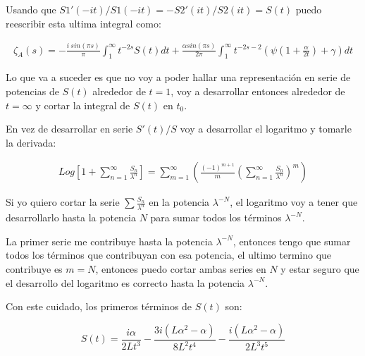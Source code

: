 Usando que $S1' (-it)/S1 (-i t) = - S2 ' (i t) / S2(it)  = S(t) $ puedo reescribir esta ultima integral como:

\begin{equation}
\begin{array}{c}
\zeta _A (s) =  
-  \frac{i \ sin (\pi s)}{\pi} \int _1 ^{\infty} t ^{-2s} S(t) dt + 
\frac{\alpha sin( \pi s )}{2 \pi } \int _{1} ^{\infty} 
t ^{-2s-2} \left( \psi (1 + \frac{\alpha}{2 t}) + \gamma \right) dt
\end{array}
\end{equation}

Lo que va a suceder es que no voy a poder hallar una representación en serie de potencias de $S(t)$ alrededor de $t=1$, voy a desarrollar entonces alrededor de $t = \infty$ y cortar la integral de $S(t) $ en $t _0$.




En vez de desarrollar en serie $S'(t) /S$ voy a desarrollar el logaritmo y tomarle la derivada:

\begin{equation}
\begin{array}{c}

Log 
\left[
	1 + \sum _{n=1} ^{\infty}  \frac{S _n}{\lambda ^n}
	\right] =
	
\sum _{m = 1} ^{\infty} 
	\left(
	\frac{(-1) ^{m+1} }{m}
	\left(
		\sum _{n=1} ^{\infty} \frac{S _n}{\lambda ^n}
		\right) ^m 
	\right)
\end{array}	
\end{equation}

Si yo quiero cortar la serie $\sum \frac{S _n}{\lambda ^n}$ en la potencia $\lambda ^{-N}$, el logaritmo voy a tener que desarrollarlo hasta la potencia $N$ para sumar todos los términos $\lambda ^{-N}$.

La primer serie me contribuye hasta la potencia $\lambda ^{-N}$, entonces tengo que sumar todos los términos que contribuyan con esa potencia, el ultimo termino que contribuye es $m=N$, entonces puedo cortar ambas series en $N$ y estar seguro que el desarrollo del logaritmo es correcto hasta la potencia $\lambda ^{-N}$.

Con este cuidado, los primeros términos de $S(t)$ son:

\begin{equation}
S(t) = 
\frac{i \alpha}{2 L t^3} -
\frac{3 i (L \alpha ^2 - \alpha)}{8 L^2 t ^4} -
\frac{i ( L \alpha ^2 - \alpha )}{2 L^3 t^5}
\end{equation}

